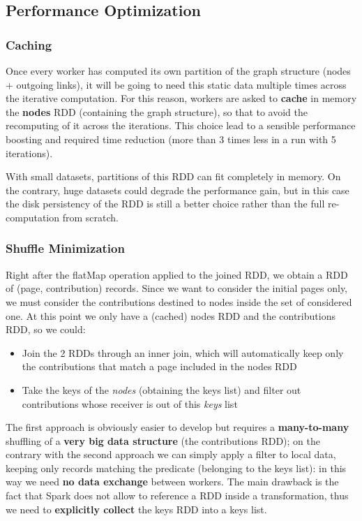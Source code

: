 \subsection{Performance Optimization}
\subsubsection{Caching}
Once every worker has computed its own partition of the graph structure (nodes + outgoing links), it will be going to need this static data multiple times across the iterative computation. For this reason, workers are asked to \textbf{cache} in memory the \textbf{nodes} RDD (containing the graph structure), so that to avoid the recomputing of it across the iterations. This choice lead to a sensible performance boosting and required time reduction (more than 3 times less in a run with 5 iterations).

\noindent With small datasets, partitions of this RDD can fit completely in memory. On the contrary, huge datasets could degrade the performance gain, but in this case the disk persistency of the RDD is still a better choice rather than the full re-computation from scratch.   


\subsubsection{Shuffle Minimization}
Right after the flatMap operation applied to the joined RDD, we obtain a RDD of (page, contribution) records. Since we want to consider the initial pages only, we must consider the contributions destined to nodes inside the set of considered one. At this point we only have a (cached) nodes RDD and the contributions RDD, so we could:

\begin{itemize}
	\item Join the 2 RDDs through an inner join, which will automatically keep only the contributions that match a page included in the nodes RDD
	\item Take the keys of the \textit{nodes} (obtaining the keys list) and filter out contributions whose receiver is out of this \textit{keys} list
\end{itemize}

The first approach is obviously easier to develop but requires a \textbf{many-to-many} shuffling of a \textbf{very big data structure} (the contributions RDD); on the contrary with the second approach we can simply apply a filter to local data, keeping only records matching the predicate (belonging to the keys list): in this way we need \textbf{no data exchange} between workers. The main drawback is the fact that Spark does not allow to reference a RDD inside a transformation, thus we need to \textbf{explicitly collect} the keys RDD into a keys list.

